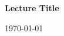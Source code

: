 \documentclass[letterpaper,11pt]{article}
\newcommand{\coursetopic}{Lecture Title}
\begin{document}
\begin{center}{\huge \bfseries \coursetopic}\end{center}  %
\begin{flushright} \today\end{flushright}                 %
\end{document}
